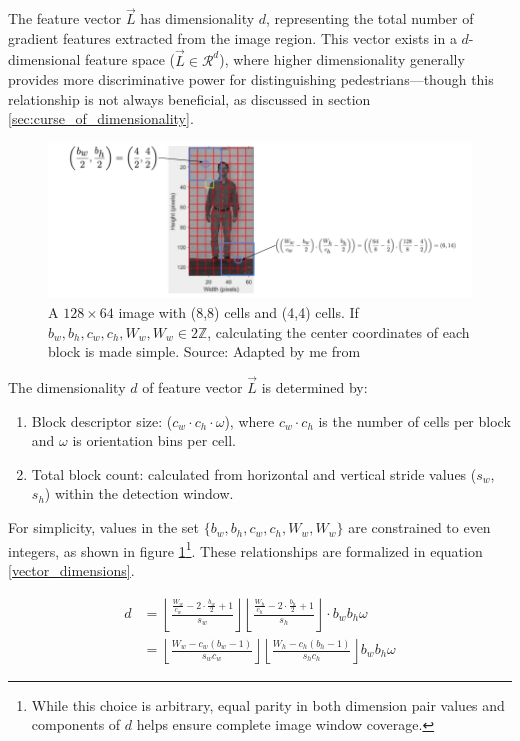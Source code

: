 The feature vector $\vec{L}$ has dimensionality $d$, representing the total number of gradient features extracted from the image region. This vector exists in a $d$-dimensional feature space ($\vec{L} \in \mathcal{R}^{d}$), where higher dimensionality generally provides more discriminative power for distinguishing pedestrians—though this relationship is not always beneficial, as discussed in section \ref{sec:curse_of_dimensionality}.

\begin{figure}
    \centering
    \includegraphics[width=1\linewidth]{images/Center Coordinates.png}
    \caption{A $128\times64$ image with (8,8) cells and (4,4) cells. If $b_w,b_h,c_w,c_h,W_w,W_w\in2\mathbb{Z}$, calculating the center coordinates of each block is made simple. Source: Adapted by me from \cite{shidlovskiy_2020_reducing}}
    \label{fig:center_coords}
\end{figure}

The dimensionality $d$ of feature vector $\vec{L}$ is determined by:
\begin{enumerate}
    \item Block descriptor size: ($c_w \cdot c_h \cdot \omega$), where $c_w \cdot c_h$ is the number of cells per block and $\omega$ is orientation bins per cell.
    \item Total block count: calculated from horizontal and vertical stride values ($s_w$, $s_h$) within the detection window.
\end{enumerate}

For simplicity, values in the set $\{b_w,b_h,c_w,c_h,W_w,W_w\}$ are constrained to even integers, as shown in figure \ref{fig:center_coords}\footnote{While this choice is arbitrary, equal parity in both dimension pair values and components of $d$ helps ensure complete image window coverage.}. These relationships are formalized in equation \ref{vector_dimensions}.

\begin{equation}
    \label{vector_dimensions}
    \begin{split}
    d &= \left\lfloor \frac{\frac{W_w}{c_w}-2\cdot\frac{b_w}{2}+1}{s_w} \right\rfloor\left\lfloor \frac{\frac{W_h}{c_h}-2\cdot\frac{b_h}{2}+1}{s_h} \right\rfloor\cdot b_w b_h\omega \\ &= \left\lfloor  \frac{W_w- c_w(b_w-1)}{s_w c_w}  \right\rfloor \left\lfloor   \frac{W_h -c_h(b_h -1)}{s_h c_h} \right\rfloor b_w b_h\omega
    \end{split}
\end{equation}

